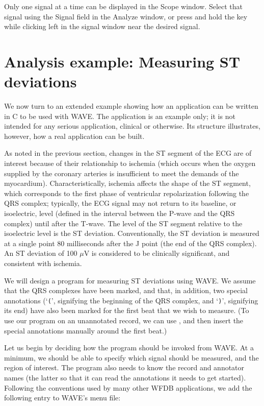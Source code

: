 \documentclass[twoside]{book}
\newcommand{\keycap}[1]{\cornersize{.5}\Ovalbox{\small\sf #1}}
\newcommand{\button}[1]{\cornersize{2}\ovalbox{\rule[-.3mm]{0cm}{2.5mm}\small\sf ~#1~}}
\newcommand{\WAVE}{{\sf WAVE}\xspace}
\begin{document}
Only one signal at a time can be displayed in the {\sf Scope} window.
Select that signal using the {\sf Signal} field in the {\sf Analyze}
window, or press and hold the \keycap{Shift} key while clicking left
in the signal window near the desired signal.

\section{Analysis example: Measuring ST deviations}

We now turn to an extended example showing how an
application can be written in C to be used with \WAVE{}.  The
application is an example only;  it is not intended for any serious
application, clinical or otherwise.  Its structure illustrates,
however, how a real application can be built.

As noted in the previous section, changes in the ST segment of the ECG
are of interest because of their relationship to ischemia
(which occurs when the oxygen supplied by the coronary arteries is
insufficient to meet the demands of the myocardium).
Characteristically, ischemia affects the shape of the ST segment, 
which corresponds to the first phase of ventricular repolarization
following the QRS complex;  typically, the ECG signal may not return 
to its baseline, or isoelectric, level (defined in the interval
between the P-wave and the QRS complex) until after the T-wave.  The
level of the ST segment relative to the isoelectric level is the ST
deviation.  Conventionally, the ST deviation is measured at a single
point 80 milliseconds after the J point (the end of the QRS complex).
An ST deviation of 100 $\mu$V is considered to be clinically
significant, and consistent with ischemia.

We will design a program for measuring ST deviations using \WAVE{}.  We
assume that the QRS complexes have been marked, and that, in addition,
two special annotations (`{\tt (}', signifying the beginning of the QRS
complex, and `{\tt )}', signifying its end) have also been marked for the
first beat that we wish to measure.  (To use our program on an
unannotated record, we can use \button{Mark QRS complexes}, and then
insert the special annotations manually around the first beat.)

Let us begin by deciding how the program should be invoked from \WAVE{}.
At a minimum, we should be able to specify which signal should be
measured, and the region of interest.  The program also needs to know
the record and annotator names (the latter so that it can read the
annotations it needs to get started).  Following the conventions
used by many other WFDB applications, we add the following entry to
\WAVE{}'s menu file:
\end{document}
